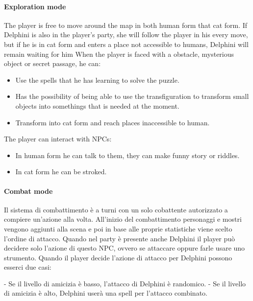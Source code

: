 \paragraph{Exploration mode}

The player is free to move around  the map in both human form that cat form. If Delphini is also in the player's party, she will follow the player in his every move, but if he is in cat form and enters a place not accessible to humans, Delphini will remain waiting for him When the player is faced with a obstacle, mysterious object or secret passage, he can: 

\begin{itemize}
    \item Use the spells that he has learning to solve the puzzle.
    \item Has the possibility of being able to use the transfiguration to transform small objects into somethings that is needed at the moment.
    \item Transform into cat form and reach places inaccessible to human.
\end{itemize}

The player can interact with NPCs:

\begin{itemize}
    \item In human form he can talk to them, they can make funny story or riddles.
    \item In cat form he can be stroked.
\end{itemize}


\paragraph{Combat mode}

Il sistema di combattimento è a turni con un solo cobattente autorizzato a compiere un'azione alla volta. All'inizio del combattimento personaggi e mostri vengono aggiunti alla scena e poi in base alle proprie statistiche viene scelto l'ordine di attacco. Quando nel party è presente anche Delphini il player può decidere solo l'azione di questo NPC, ovvero se attaccare oppure farle usare uno strumento. Quando il player decide l'azione di attacco per Delphini possono esserci due casi:

- Se il livello di amicizia è basso, l'attacco di Delphini è randomico.
- Se il livello di amicizia è alto, Delphini userà una spell per l'attacco combinato.

